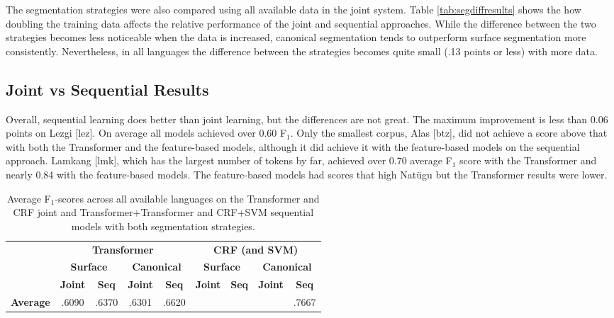 The segmentation strategies were also compared using all available data in the joint system. Table \ref{tab:segdiffresults} shows the how doubling the training data affects the relative performance of the joint and sequential approaches. 
While the difference between the two strategies becomes less noticeable when the data is increased, canonical segmentation tends to outperform surface segmentation more consistently. Nevertheless, in all languages the difference between the strategies becomes quite small (.13 points or less) with more data. 

\subsection{Joint vs Sequential Results}

Overall, sequential learning does better than joint learning, but the differences are not great. The maximum improvement is less than 0.06 points on Lezgi [lez]. On average all models achieved over 0.60 F$_1$. Only the smallest corpus, Alas [btz], did not achieve a score above that with both the Transformer and the feature-based models, although it did achieve it with the feature-based models on the sequential approach. Lamkang [lmk], which has the largest number of tokens by far, achieved over 0.70 average F$_1$ score with the Transformer and nearly 0.84 with the feature-based models. The feature-based models had scores that high Nat\"ugu but the Transformer results were lower.

\begin{table}[!tb]
    \centering
    \begin{tabular}{l|cc|cc|cc|cc}
          & \multicolumn{4}{c|}{\textbf{Transformer}} & \multicolumn{4}{c}{\textbf{CRF (and SVM)}} 
          \\
          & \multicolumn{2}{c|}{\textbf{Surface}} & \multicolumn{2}{c|}{\textbf{Canonical}}  & \multicolumn{2}{c|}{\textbf{Surface}} & \multicolumn{2}{c}{\textbf{Canonical}} 
          \\
          &  \textbf{Joint} & \textbf{Seq} &  \textbf{Joint} & \textbf{Seq} &  \textbf{Joint} & \textbf{Seq} &  \textbf{Joint} & \textbf{Seq} \\
         \hline
         \textbf{Average} & .6090 & .6370 & .6301 & .6620 
                 &  &  &  & .7667 \\
    \end{tabular}
    \caption[Average Results of All Joint and Sequential models]{Average F$_1$-scores across all available languages on the Transformer and CRF joint and Transformer+Transformer and CRF+SVM sequential models with both segmentation strategies.}
    \label{tab:allsgresults}
\end{table}

